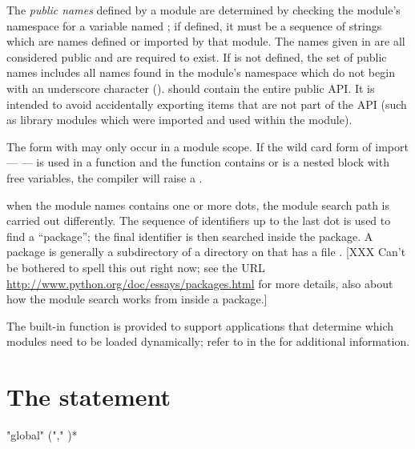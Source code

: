 The \emph{public names} defined by a module are determined by checking
the module's namespace for a variable named ; if
defined, it must be a sequence of strings which are names defined or
imported by that module.  The names given in  are all
considered public and are required to exist.  If  is not
defined, the set of public names includes all names found in the
module's namespace which do not begin with an underscore character
(\character{_}).   should contain the entire public API.
It is intended to avoid accidentally exporting items that are not part
of the API (such as library modules which were imported and used within
the module).

The  form with \samp{*} may only occur in a module
scope.  If the wild card form of import ---  --- is
used in a function and the function contains or is a nested block with
free variables, the compiler will raise a .


when the module names contains one or more dots, the module search
path is carried out differently.  The sequence of identifiers up to
the last dot is used to find a ``package''; the final
identifier is then searched inside the package.  A package is
generally a subdirectory of a directory on  that has a
file .
%
[XXX Can't be bothered to spell this out right now; see the URL
\url{http://www.python.org/doc/essays/packages.html} for more details, also
about how the module search works from inside a package.]

The built-in function  is provided to support
applications that determine which modules need to be loaded
dynamically; refer to  in the
 for additional
information.


\section{The  statement \label{global}}

\begin{productionlist}
             {"global"  ("," )*}
\end{productionlist}

